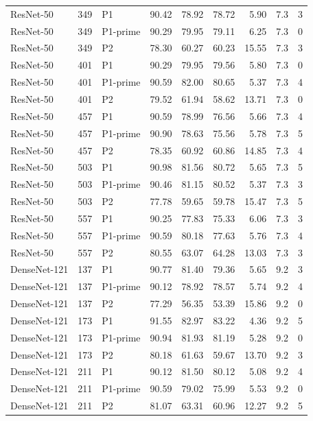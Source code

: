 {\begin{longtable}{lrlrrrrrr}
ResNet-50 & 349 & P1 & 90.42 & 78.92 & 78.72 & 5.90 & 7.3 & 3 \\
ResNet-50 & 349 & P1-prime & 90.29 & 79.95 & 79.11 & 6.25 & 7.3 & 0 \\
ResNet-50 & 349 & P2 & 78.30 & 60.27 & 60.23 & 15.55 & 7.3 & 3 \\
ResNet-50 & 401 & P1 & 90.29 & 79.95 & 79.56 & 5.80 & 7.3 & 0 \\
ResNet-50 & 401 & P1-prime & 90.59 & 82.00 & 80.65 & 5.37 & 7.3 & 4 \\
ResNet-50 & 401 & P2 & 79.52 & 61.94 & 58.62 & 13.71 & 7.3 & 0 \\
ResNet-50 & 457 & P1 & 90.59 & 78.99 & 76.56 & 5.66 & 7.3 & 4 \\
ResNet-50 & 457 & P1-prime & 90.90 & 78.63 & 75.56 & 5.78 & 7.3 & 5 \\
ResNet-50 & 457 & P2 & 78.35 & 60.92 & 60.86 & 14.85 & 7.3 & 4 \\
ResNet-50 & 503 & P1 & 90.98 & 81.56 & 80.72 & 5.65 & 7.3 & 5 \\
ResNet-50 & 503 & P1-prime & 90.46 & 81.15 & 80.52 & 5.37 & 7.3 & 3 \\
ResNet-50 & 503 & P2 & 77.78 & 59.65 & 59.78 & 15.47 & 7.3 & 5 \\
ResNet-50 & 557 & P1 & 90.25 & 77.83 & 75.33 & 6.06 & 7.3 & 3 \\
ResNet-50 & 557 & P1-prime & 90.59 & 80.18 & 77.63 & 5.76 & 7.3 & 4 \\
ResNet-50 & 557 & P2 & 80.55 & 63.07 & 64.28 & 13.03 & 7.3 & 3 \\
DenseNet-121 & 137 & P1 & 90.77 & 81.40 & 79.36 & 5.65 & 9.2 & 3 \\
DenseNet-121 & 137 & P1-prime & 90.12 & 78.92 & 78.57 & 5.74 & 9.2 & 4 \\
DenseNet-121 & 137 & P2 & 77.29 & 56.35 & 53.39 & 15.86 & 9.2 & 0 \\
DenseNet-121 & 173 & P1 & 91.55 & 82.97 & 83.22 & 4.36 & 9.2 & 5 \\
DenseNet-121 & 173 & P1-prime & 90.94 & 81.93 & 81.19 & 5.28 & 9.2 & 0 \\
DenseNet-121 & 173 & P2 & 80.18 & 61.63 & 59.67 & 13.70 & 9.2 & 3 \\
DenseNet-121 & 211 & P1 & 90.12 & 81.50 & 80.12 & 5.08 & 9.2 & 4 \\
DenseNet-121 & 211 & P1-prime & 90.59 & 79.02 & 75.99 & 5.53 & 9.2 & 0 \\
DenseNet-121 & 211 & P2 & 81.07 & 63.31 & 60.96 & 12.27 & 9.2 & 5 \\

\end{longtable}}
